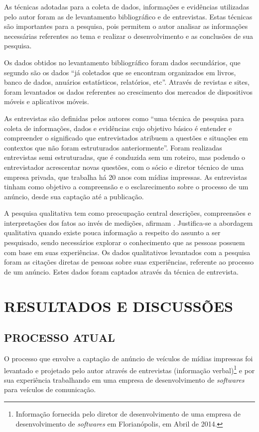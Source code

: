 \documentclass[
	12pt,				%
	openright,			%
	oneside,			%
	a4paper,			%
	chapter=TITLE,		%
	section=TITLE,		%
	english,			%
	french,				%
	spanish,			%
	brazil				%
	]{abntex2}
\begin{document}
As técnicas adotadas para a coleta de dados, informações e evidências utilizadas pelo autor foram as de levantamento bibliográfico e de entrevistas. Estas técnicas são importantes para a pesquisa, pois permitem o autor analisar as informações necessárias referentes ao tema e realizar o desenvolvimento e as conclusões de sua pesquisa.

Os dados obtidos no levantamento bibliográfico foram dados secundários, que segundo  são os dados “já coletados que se encontram organizados em livros, banco de dados, anuários estatísticos, relatórios, etc”. Através de revistas e sites, foram levantados os dados referentes ao crescimento dos mercados de dispositivos móveis e aplicativos móveis.

As entrevistas são definidas pelos autores  como “uma técnica de pesquisa para coleta de informações, dados e evidências cujo objetivo básico é entender e compreender o significado que entrevistados atribuem a questões e situações em contextos que não foram estruturados anteriormente”. Foram realizadas entrevistas semi estruturadas, que é conduzida sem um roteiro, mas podendo o entrevistador acrescentar novas questões, com o sócio e diretor técnico de uma empresa privada, que trabalha há 20 anos com mídias impressas. As entrevistas tinham como objetivo a compreensão e o esclarecimento sobre o processo de um anúncio, desde sua captação até a publicação.

A pesquisa qualitativa tem como preocupação central descrições, compreensões e interpretações dos fatos ao invés de medições, afirmam . Justifica-se a abordagem qualitativa quando existe pouca informação a respeito do assunto a ser pesquisado, sendo necessários explorar o conhecimento que as pessoas possuem com base em suas experiências. Os dados qualitativos levantados com a pesquisa foram as citações diretas de pessoas sobre suas experiências, referente ao processo de um anúncio. Estes dados foram captados através da técnica de entrevista.


\chapter{RESULTADOS E DISCUSSÕES}


\section{PROCESSO ATUAL}
O processo que envolve a captação de anúncio de veículos de mídias impressas foi levantado e projetado pelo autor através de entrevistas (informação verbal)\footnote{Informação fornecida pelo diretor de desenvolvimento de uma empresa de desenvolvimento de \textit{softwares} em Florianópolis, em Abril de 2014.} e por sua experiência trabalhando em uma empresa de desenvolvimento de \textit{softwares} para veículos de comunicação.
\end{document}
